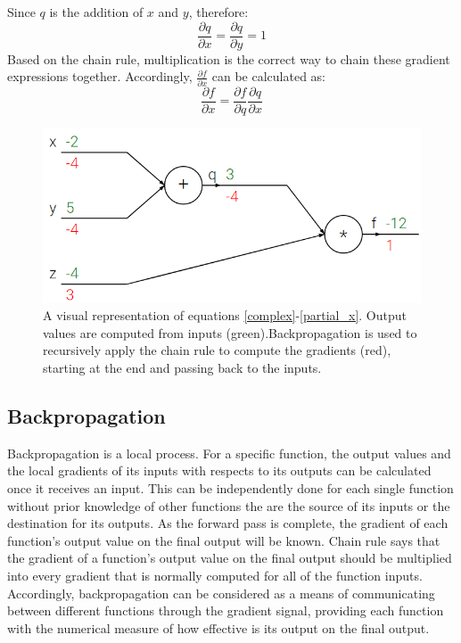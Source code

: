 Since \(q\) is the addition of \(x\) and \(y\), therefore:
\begin{equation}
\frac{\partial q}{\partial x} = \frac{\partial q}{\partial y} = 1
\end{equation}
Based on the chain rule, multiplication is the correct way to chain these gradient expressions together. Accordingly, \(\frac{\partial f}{\partial x}\) can be calculated as:
\begin{equation}
\frac{\partial f}{\partial x} = \frac{\partial f}{\partial q} \frac{\partial q}{\partial x}
\label{partial_x}
\end{equation}
\begin{figure}[ht]
\includegraphics[trim={0cm 0cm 0cm 0cm},clip,width=0.75\linewidth]{Figures/grad_1.png}
\centering
\caption{A visual representation of equations \ref{complex}-\ref{partial_x}. Output values are computed from inputs (green).Backpropagation is used to recursively apply the chain rule to compute the gradients (red), starting at the end and passing back to the inputs.}
\label{grad_1}
\end{figure}


\subsection{Backpropagation}
Backpropagation is a local process. For a specific function, the output values and the local gradients of its inputs with respects to its outputs can be calculated once it receives an input. This can be independently done for each single function without prior knowledge of other functions the are the source of its inputs or the destination for its outputs. As the forward pass is complete, the gradient of each function's output value on the final output will be known. Chain rule says that the gradient of a function's output value on the final output should be multiplied  into every gradient that is normally computed for all of the function inputs. Accordingly, backpropagation can be considered as a means of communicating between different functions through the gradient signal, providing each function with the numerical measure of how effective is its output on the final output. \cite{backprop}

